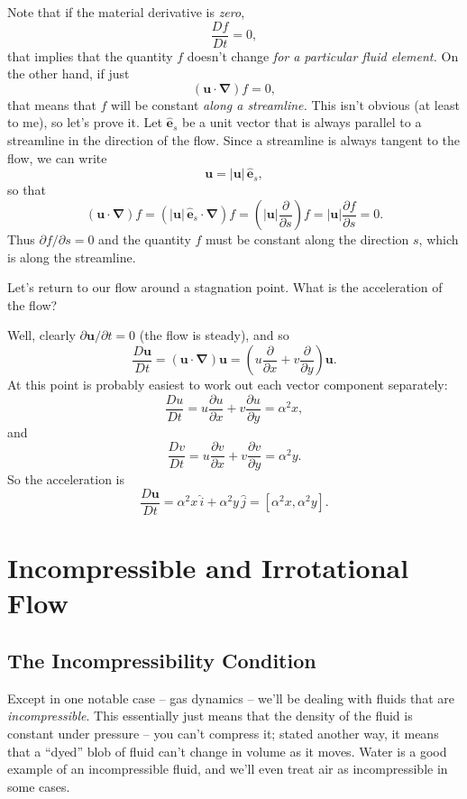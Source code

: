 Note that if the material derivative is \emph{zero},
\[
\frac{Df}{Dt} = 0,
\]
that implies that the quantity $f$ doesn't change \emph{for a particular fluid element.}  On the other hand, if just
\[
(\mathbf{u} \cdot \boldsymbol{\nabla}) f = 0,
\]
that means that $f$ will be constant \emph{along a streamline.}  This isn't obvious (at least to me), so let's prove it.  Let $\hat{\mathbf{e}}_s$ be a unit vector that is always parallel to a streamline in the direction of the flow.  Since a streamline is always tangent to the flow, we can write
\[
\mathbf{u} = |\mathbf{u}| \, \hat{\mathbf{e}}_s,
\]
so that
\[
(\mathbf{u} \cdot \boldsymbol{\nabla}) f = (|\mathbf{u}| \, \hat{\mathbf{e}}_s \cdot \boldsymbol{\nabla}) f = (|\mathbf{u}| \frac{\partial }{\partial s} )f = |\mathbf{u}| \frac{\partial f}{\partial s} = 0.
\]
Thus $\partial f / \partial s = 0$ and the quantity $f$ must be constant along the direction $s$, which is along the streamline.

\begin{example}
Let's return to our flow around a stagnation point.  What is the acceleration of the flow?

Well, clearly $\partial \mathbf{u} /\partial t = 0$ (the flow is steady), and so
\[
\frac{D \mathbf{u}}{Dt} = (\mathbf{u} \cdot \boldsymbol{\nabla} ) \mathbf{u} = \left( u \frac{\partial}{\partial x} + v\frac{\partial}{\partial y} \right) \mathbf{u}.
\]
At this point is probably easiest to work out each vector component separately:
\[
\frac{D u}{Dt} =  u \frac{\partial u}{\partial x} + v\frac{\partial u}{\partial y}  = \alpha^2 x,
\]
and
\[
\frac{D v}{Dt} =  u \frac{\partial v}{\partial x} + v\frac{\partial v}{\partial y}  = \alpha^2 y.
\]
So the acceleration is
\[
\frac{D \mathbf{u}}{Dt} = \alpha^2 x \, \hat{i} + \alpha^2 y \, \hat{j} = [\alpha^2 x, \alpha^2 y].
\]

\end{example}




\section{Incompressible and Irrotational Flow}

\subsection{The Incompressibility Condition}
\label{sec_incompressibility}

Except in one notable case -- gas dynamics -- we'll be dealing with fluids that are \emph{incompressible}.  This essentially just means that the density of the fluid is constant under pressure -- you can't compress it; stated another way, it means that a ``dyed'' blob of fluid can't change in volume as it moves.  Water is a good example of an incompressible fluid, and we'll even treat air as incompressible in some cases.

